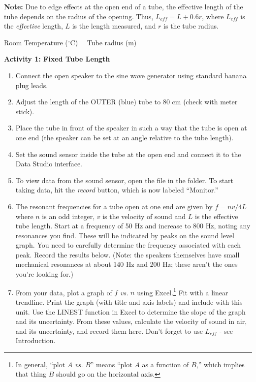 \textbf{Note:} Due to edge effects at the open end of a tube, the effective length of the tube depends on the radius of the opening. Thus, $L_{eff} = L + 0.6r$, where $L_{eff}$ is the \textit{effective} length, $L$ is the length measured, and $r$ is the tube radius.

\medskip
Room Temperature ($^\circ$C) \hrulefill \ \  Tube radius (m) \hrulefill

\bigskip

\textbf{Activity 1: Fixed Tube Length} 
\begin{enumerate}[labparts]

\item Connect the open speaker to the sine wave generator using standard banana plug leads.

\item Adjust the length of the OUTER (blue) tube to 80 cm (check with meter stick).

\item Place the tube in front of the speaker in such a way that the tube is open at one end (the speaker can be set at an angle relative to the tube length).

\item Set the sound sensor inside the tube at the open end and connect it to the Data Studio interface.

\item To view data from the sound sensor, open the file  in the \filename{\coursefolder} folder.  To start taking data, hit the \textit{record} button, which is now labeled ``Monitor.'' 

\item The resonant frequencies for a tube open at one end are given by $f=nv/4L$ where $n$ is an odd integer, $v$ is the velocity of sound and $L$ is the effective tube length. Start at a frequency of 50 Hz and increase to 800 Hz, noting any resonances you find.   These will be indicated by peaks on the sound level graph. You need to carefully determine the frequency associated with each peak.  Record the results below. (Note: the speakers themselves have small mechanical resonances at about 140 Hz and 200 Hz; these aren't the ones you're looking for.)
\vspace{10mm}

\item From your data, plot a graph of $f$ \textit{vs.} $n$ using Excel.\footnote{In general, ``plot $A$ \textit{vs.} $B$'' means ``plot $A$ as a function of $B$,'' which implies that thing $B$ should go on the horizontal axis.} Fit with a linear trendline. Print the graph (with title and axis labels) and include with this unit. Use the LINEST function in Excel to determine the slope of the graph and its uncertainty. From these values, calculate the velocity of sound in air, and its uncertainty, and record them here. Don't forget to use $L_{eff}$ - see Introduction.
\vspace{12mm}

\end{enumerate}

